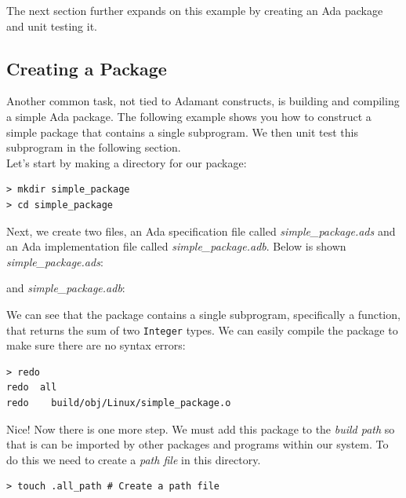 The next section further expands on this example by creating an Ada package and unit testing it.

\subsection{Creating a Package}

Another common task, not tied to Adamant constructs, is building and compiling a simple Ada package. The following example shows you how to construct a simple package that contains a single subprogram. We then unit test this subprogram in the following section. \\

Let's start by making a directory for our package:

\vspace{5mm} %
\begin{verbatim}
> mkdir simple_package 
> cd simple_package 
\end{verbatim}
\vspace{5mm} %

Next, we create two files, an Ada specification file called \textit{simple\_package.ads} and an Ada implementation file called \textit{simple\_package.adb}. Below is shown \textit{simple\_package.ads}:


and \textit{simple\_package.adb}:


We can see that the package contains a single subprogram, specifically a function, that returns the sum of two \texttt{Integer} types. We can easily compile the package to make sure there are no syntax errors:

\vspace{5mm} %
\begin{verbatim}
> redo
redo  all
redo    build/obj/Linux/simple_package.o
\end{verbatim}
\vspace{5mm} %

Nice! Now there is one more step. We must add this package to the \textit{build path} so that is can be imported by other packages and programs within our system. To do this we need to create a \textit{path file} in this directory.

\vspace{5mm} %
\begin{verbatim}
> touch .all_path # Create a path file
\end{verbatim}
\vspace{5mm} %

